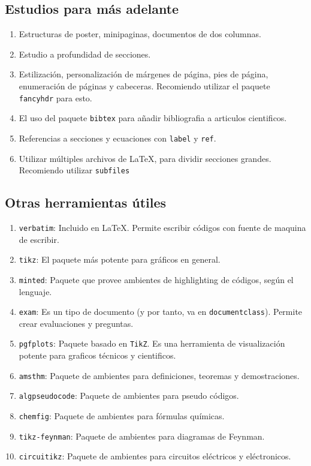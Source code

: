 \documentclass[../notes.tex]{subfiles}
\begin{document}
    \subsection{Estudios para más adelante}
        \begin{enumerate}
        	\item Estructuras de poster, minipaginas, documentos de dos columnas.
        	\item Estudio a profundidad de secciones.
        	\item Estilización, personalización de márgenes de página, pies de página, enumeración de páginas y cabeceras. Recomiendo utilizar el paquete \texttt{fancyhdr} para esto.
        	\item El uso del paquete \texttt{bibtex} para añadir bibliografia a articulos cientificos.
        	\item Referencias a secciones y ecuaciones con \texttt{label} y \texttt{ref}.
        	\item Utilizar múltiples archivos de \LaTeX{}, para dividir secciones grandes. Recomiendo utilizar \texttt{subfiles}
        \end{enumerate}
    
    \subsection{Otras herramientas útiles}
       \begin{enumerate}
            \item \texttt{verbatim}: Incluido en \LaTeX{}. Permite escribir códigos con fuente de maquina de escribir.
            \item \texttt{tikz}: El paquete más potente para gráficos en general.
            \item \texttt{minted}: Paquete que provee ambientes de highlighting de códigos, según el lenguaje.
            \item \texttt{exam}: Es un tipo de documento (y por tanto, va en \texttt{documentclass}). Permite crear evaluaciones y preguntas.
            \item \texttt{pgfplots}: Paquete basado en \texttt{TikZ}. Es una herramienta de visualización potente para graficos técnicos y cientificos.
            \item \texttt{amsthm}: Paquete de ambientes para definiciones, teoremas y demostraciones.
            \item \texttt{algpseudocode}: Paquete de ambientes para pseudo códigos.
            \item \texttt{chemfig}: Paquete de ambientes para fórmulas químicas.
            \item \texttt{tikz-feynman}: Paquete de ambientes para diagramas de Feynman.
            \item \texttt{circuitikz}: Paquete de ambientes para circuitos eléctricos y eléctronicos.
       \end{enumerate}
    
\end{document}
